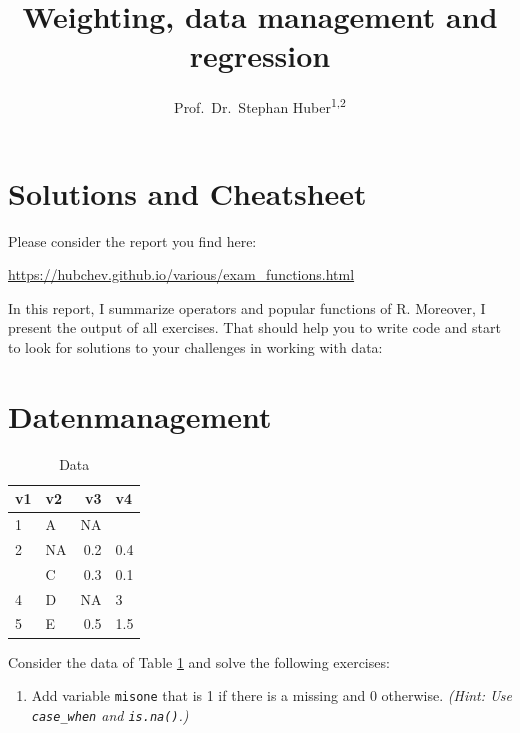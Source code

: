 \documentclass[
  doc]{apa6}
\title{Weighting, data management and regression}
\author{Prof.~Dr.~Stephan Huber\textsuperscript{1,2}}
\date{}
\affiliation{\vspace{0.5cm}\textsuperscript{1} Fresenius University of Applied Science\\\textsuperscript{2} Charlotte Fresenius University}
\providecommand{\tightlist}{%
  \setlength{\itemsep}{0pt}\setlength{\parskip}{0pt}}
\begin{document}
\maketitle

\newpage

\section{Solutions and Cheatsheet}\label{solutions-and-cheatsheet}

Please consider the report you find here:

\url{https://hubchev.github.io/various/exam_functions.html}

In this report, I summarize operators and popular functions of R. Moreover, I present the output of all exercises. That should help you to write code and start to look for solutions to your challenges in working with data:

\section{Datenmanagement}\label{datenmanagement}

\begin{table}

\caption{\label{tab:data1}Data}
\centering
\begin{tabular}[t]{l|l|r|l}
\hline
v1 & v2 & v3 & v4\\
\hline
1 & A & NA & \\
\hline
2 & NA & 0.2 & 0.4\\
\hline
 & C & 0.3 & 0.1\\
\hline
4 & D & NA & 3\\
\hline
5 & E & 0.5 & 1.5\\
\hline
\end{tabular}
\end{table}

Consider the data of Table \ref{tab:data1} and solve the following exercises:

\begin{enumerate}
\def\labelenumi{\alph{enumi})}
\tightlist
\item
  Add variable \texttt{misone} that is 1 if there is a missing and 0 otherwise.
  \emph{(Hint: Use \texttt{case\_when} and \texttt{is.na()}.)}
\end{enumerate}

\newpage
\end{document}
